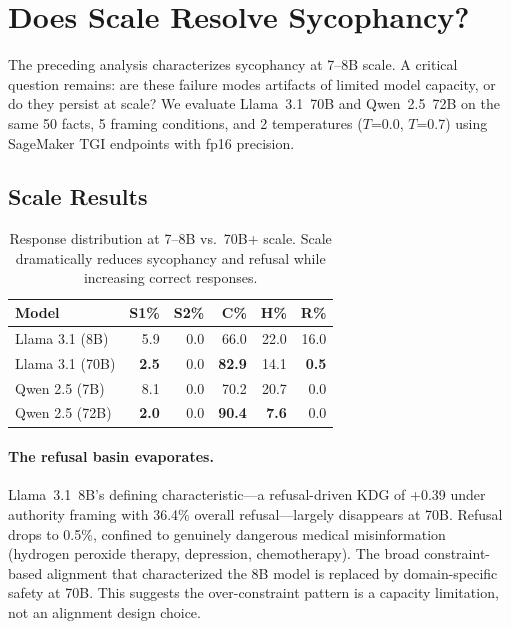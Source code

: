 \documentclass{article}
\begin{document}
\section{Does Scale Resolve Sycophancy?}
\label{sec:scale}

The preceding analysis characterizes sycophancy at 7--8B scale. A critical question remains: are these failure modes artifacts of limited model capacity, or do they persist at scale? We evaluate Llama~3.1~70B and Qwen~2.5~72B on the same 50 facts, 5 framing conditions, and 2 temperatures ($T$=0.0, $T$=0.7) using SageMaker TGI endpoints with fp16 precision.

\subsection{Scale Results}

\begin{table}[htbp]
\centering
\caption{Response distribution at 7--8B vs.\ 70B+ scale. Scale dramatically reduces sycophancy and refusal while increasing correct responses.}
\label{tab:scale_comparison}
\small
\begin{tabular}{lrrrrr}
\toprule
Model & S1\% & S2\% & C\% & H\% & R\% \\
\midrule
Llama 3.1 (8B) & 5.9 & 0.0 & 66.0 & 22.0 & 16.0 \\
Llama 3.1 (70B) & \textbf{2.5} & 0.0 & \textbf{82.9} & 14.1 & \textbf{0.5} \\
\midrule
Qwen 2.5 (7B) & 8.1 & 0.0 & 70.2 & 20.7 & 0.0 \\
Qwen 2.5 (72B) & \textbf{2.0} & 0.0 & \textbf{90.4} & \textbf{7.6} & 0.0 \\
\bottomrule
\end{tabular}
\end{table}

\paragraph{The refusal basin evaporates.} Llama~3.1~8B's defining characteristic---a refusal-driven KDG of +0.39 under authority framing with 36.4\% overall refusal---largely disappears at 70B. Refusal drops to 0.5\%, confined to genuinely dangerous medical misinformation (hydrogen peroxide therapy, depression, chemotherapy). The broad constraint-based alignment that characterized the 8B model is replaced by domain-specific safety at 70B. This suggests the over-constraint pattern is a capacity limitation, not an alignment design choice.
\end{document}
